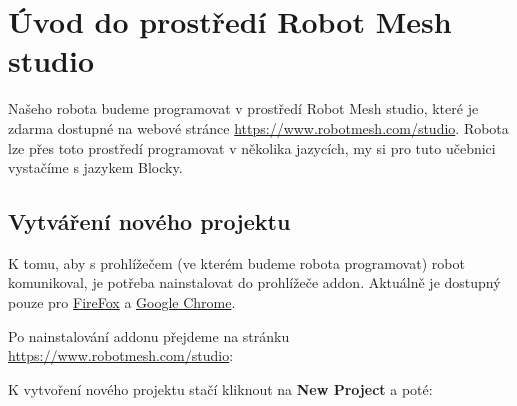 \documentclass[main.tex]{subfiles}
\begin{document}
	\section{Úvod do prostředí Robot Mesh studio}

	Našeho robota budeme programovat v prostředí Robot Mesh studio, které je zdarma dostupné na webové stránce \href{https://www.robotmesh.com/studio}{https://www.robotmesh.com/studio}. Robota lze přes toto prostředí programovat v několika jazycích, my si pro tuto učebnici vystačíme s jazykem Blocky.

	\subsection{Vytváření nového projektu}
	K tomu, aby s prohlížečem (ve kterém budeme robota programovat) robot komunikoval, je potřeba nainstalovat do prohlížeče addon. Aktuálně je dostupný pouze pro \href{https://addons.mozilla.org/en-US/firefox/addon/robot-mesh-connect/}{FireFox} a \href{https://chrome.google.com/webstore/detail/robot-mesh-connect-app/mapfkcmnklanficcnnjkgeneakedmjkp}{Google Chrome}.

	Po nainstalování addonu přejdeme na stránku \href{https://www.robotmesh.com/studio}{https://www.robotmesh.com/studio}:

	\begin{figure}[h!]
		\centering
	\end{figure}

	K vytvoření nového projektu stačí kliknout na \textbf{New Project} a poté:
\end{document}
